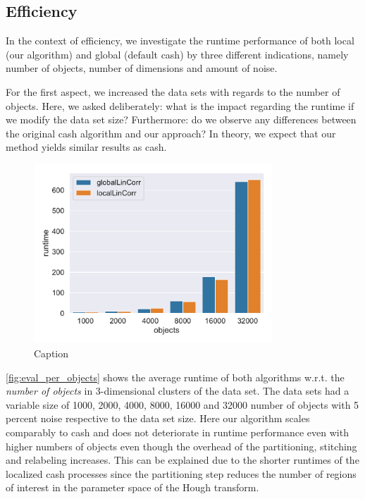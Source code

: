 \subsection{Efficiency}
In the context of efficiency, we investigate the runtime performance of both local (our algorithm) and global (default \gls{cash}) by three different indications, namely number of objects, number of dimensions and amount of noise.

For the first aspect, we increased the data sets with regards to the number of objects. Here, we asked deliberately: what is the impact regarding the runtime if we modify the data set size?
Furthermore: do we observe any differences between the original \gls{cash} algorithm and our approach? In theory, we expect that our method yields similar results as \gls{cash}.


\begin{figure}[h]
    \centering
    \includegraphics[width=0.8\textwidth]{evaluation/per_objects/Avg_Runtime_3D_N5_pobjects_bar.pdf}
    \caption{Caption}
    \label{fig:eval_per_objects}   
\end{figure}

\autoref{fig:eval_per_objects} shows the average runtime of both algorithms w.r.t. the \textit{number of objects} in 3-dimensional clusters of the data set. The data sets had a variable size of 1000, 2000, 4000, 8000, 16000 and 32000 number of objects with 5 percent noise respective to the data set size. Here our algorithm scales comparably to \gls{cash} and does not deteriorate in runtime performance even with higher numbers of objects even though the overhead of the partitioning, stitching and relabeling increases. This can be explained due to the shorter runtimes of the localized \gls{cash} processes since the partitioning step reduces the number of regions of interest in the parameter space of the Hough transform.\\


